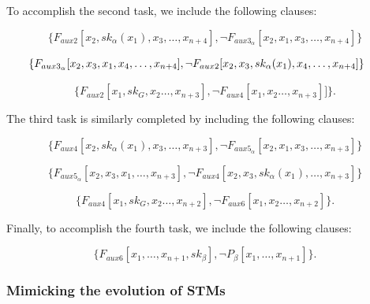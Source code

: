 \documentclass[%
  manuscript=article,   %
  year=2024,
  volume=77,
  doi=10.59203/zfn.77.694,
]{zfn}
\begin{document}
To accomplish the second task, we include the following clauses:

\begin{equation}
\{F_{aux2}[x_2, sk_{\alpha}(x_1), x_3, \ldots, x_{n+4}], 
\neg F_{aux3_{\alpha}}[x_2, x_1, x_3, \ldots, x_{n+4}]\}
\end{equation}

\begin{equation}
\hspace{-0.5cm} \{F_{aux3_{\alpha}}[x_2, x_3, x_1, x_4, \ldots, x_{n+4}],
\neg F_{aux2}[x_2, x_3, sk_{\alpha}(x_1), x_4, \ldots , x_{n+4}]\}
\end{equation}

\begin{equation}
\{F_{aux2}[x_1, sk_G, x_2\ldots, x_{n+3}],
\neg F_{aux4}[x_1, x_2 \ldots, x_{n+3}]]\}.
\end{equation}

The third task is similarly completed by including the following clauses:

\begin{equation}\{F_{aux4}[x_2, sk_{\alpha}(x_1), x_3, \ldots, x_{n+3}], 
\neg F_{aux5_{\alpha}}[x_2, x_1, x_3, \ldots, x_{n+3}]\}
\end{equation}

\begin{equation}
\{F_{aux5_{\alpha}}[x_2, x_3, x_1, \ldots, x_{n+3}],
\neg F_{aux4}[x_2, x_3, sk_{\alpha}(x_1), \ldots, x_{n+3}]\}
\end{equation}

\begin{equation}
\{F_{aux4}[x_1, sk_G, x_2 \ldots, x_{n+2}],
\neg F_{aux6}[x_1, x_2 \ldots, x_{n+2}]\}.
\end{equation}

Finally, to accomplish the fourth task, we include the following clauses:

\begin{equation}
\{F_{aux6}[x_1, \ldots, x_{n+1}, sk_\beta],
\neg P_\beta[x_1, \ldots, x_{n+1}]\}. \label{Pbeta}
\end{equation}

\subsubsection{Mimicking the evolution of STMs}
\end{document}

